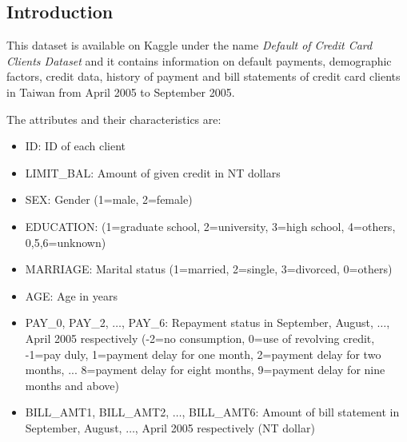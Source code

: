 \documentclass[11pt]{article}
\begin{document}
\begin{multicols}{2}

\tableofcontents
	
\section{Introduction}
This dataset is available on Kaggle under the name \textit{Default of Credit Card Clients Dataset} and it  contains information on default payments, demographic factors, credit data, history of payment and bill statements of credit card clients in Taiwan from April 2005 to September 2005.

The attributes and their characteristics are:
\begin{itemize}[noitemsep]
\item ID: ID of each client
\item LIMIT\_BAL: Amount of given credit in NT dollars
\item SEX: Gender (1=male, 2=female)
\item EDUCATION: (1=graduate school, 2=university, 3=high school, 4=others, 0,5,6=unknown)
\item MARRIAGE: Marital status (1=married, 2=single, 3=divorced, 0=others)
\item AGE: Age in years
\item PAY\_0, PAY\_2, $\hdots$, PAY\_6: Repayment status in September, August, $\hdots$, April 2005 respectively (-2=no consumption, 0=use of revolving credit, -1=pay duly, 1=payment delay for one month, 2=payment delay for two months, ... 8=payment delay for eight months, 9=payment delay for nine months and above)
\item BILL\_AMT1, BILL\_AMT2, $\hdots$,  BILL\_AMT6: Amount of bill statement in September, August, $\hdots$, April 2005 respectively (NT dollar)

\end{itemize}
\end{multicols}
\end{document}

